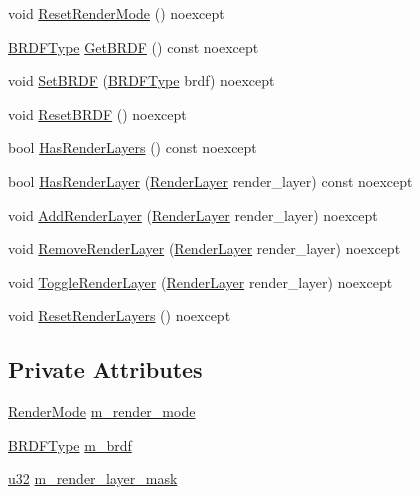 \begin{DoxyCompactItemize}
\item 
void \hyperlink{structmage_1_1_camera_settings_aa8facc0ddcd3e3d9f3c05c9f44c77b5d}{Reset\+Render\+Mode} () noexcept
\item 
\hyperlink{namespacemage_ae7a7a03a7b34d7e2689689bb8295cd38}{B\+R\+D\+F\+Type} \hyperlink{structmage_1_1_camera_settings_a31504f7e9b23404ee1b200561b8dd789}{Get\+B\+R\+DF} () const noexcept
\item 
void \hyperlink{structmage_1_1_camera_settings_a8fbc3d6013d5f711decaf6f7348f2e15}{Set\+B\+R\+DF} (\hyperlink{namespacemage_ae7a7a03a7b34d7e2689689bb8295cd38}{B\+R\+D\+F\+Type} brdf) noexcept
\item 
void \hyperlink{structmage_1_1_camera_settings_a1f8b3952282d153db4fb6416e9d933b7}{Reset\+B\+R\+DF} () noexcept
\item 
bool \hyperlink{structmage_1_1_camera_settings_a838dfb8f3d32d3d23a7c72719ce182f3}{Has\+Render\+Layers} () const noexcept
\item 
bool \hyperlink{structmage_1_1_camera_settings_a5f5f7e1019db2e65cddc1a62ae30efc7}{Has\+Render\+Layer} (\hyperlink{namespacemage_a8b4a82582105b0299e2c2be5af7255d6}{Render\+Layer} render\+\_\+layer) const noexcept
\item 
void \hyperlink{structmage_1_1_camera_settings_ab1dca8b8f52daf55614592e0bb640ae9}{Add\+Render\+Layer} (\hyperlink{namespacemage_a8b4a82582105b0299e2c2be5af7255d6}{Render\+Layer} render\+\_\+layer) noexcept
\item 
void \hyperlink{structmage_1_1_camera_settings_a358ab9da30af67ca8b1ea2a5eb5a2710}{Remove\+Render\+Layer} (\hyperlink{namespacemage_a8b4a82582105b0299e2c2be5af7255d6}{Render\+Layer} render\+\_\+layer) noexcept
\item 
void \hyperlink{structmage_1_1_camera_settings_a47c34af7eddc2a0f6256d137b5813a4c}{Toggle\+Render\+Layer} (\hyperlink{namespacemage_a8b4a82582105b0299e2c2be5af7255d6}{Render\+Layer} render\+\_\+layer) noexcept
\item 
void \hyperlink{structmage_1_1_camera_settings_afc9bcdb1f27adfb1c69a668a24113b46}{Reset\+Render\+Layers} () noexcept
\end{DoxyCompactItemize}
\subsection*{Private Attributes}
\begin{DoxyCompactItemize}
\item 
\hyperlink{namespacemage_a5e7e18b0154373ce8fc942fe3f6b27fd}{Render\+Mode} \hyperlink{structmage_1_1_camera_settings_aa4d5139b4e8668c58507ead30812c84b}{m\+\_\+render\+\_\+mode}
\item 
\hyperlink{namespacemage_ae7a7a03a7b34d7e2689689bb8295cd38}{B\+R\+D\+F\+Type} \hyperlink{structmage_1_1_camera_settings_ac6a51ea7c770af79de4f97b53cab83b7}{m\+\_\+brdf}
\item 
\hyperlink{namespacemage_af2b398bf98eb10351f49cad73fe2cc73}{u32} \hyperlink{structmage_1_1_camera_settings_ae5551fd81b3b9e0c61a3ba8b3fb40896}{m\+\_\+render\+\_\+layer\+\_\+mask}
\end{DoxyCompactItemize}



